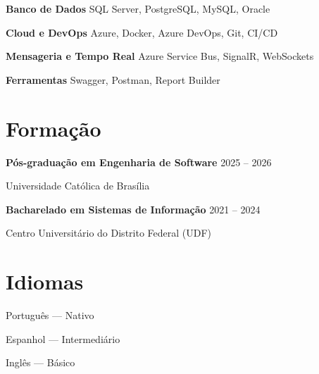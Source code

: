 \documentclass[11pt,a4paper]{article}
\begin{document}
\textbf{Banco de Dados}
SQL Server, PostgreSQL, MySQL, Oracle

\vspace{0.15cm}

\textbf{Cloud e DevOps}
Azure, Docker, Azure DevOps, Git, CI/CD

\vspace{0.15cm}

\textbf{Mensageria e Tempo Real}
Azure Service Bus, SignalR, WebSockets
\vspace{0.15cm}

\textbf{Ferramentas}
Swagger, Postman, Report Builder

\section{Formação}

\textbf{Pós-graduação em Engenharia de Software}
\hfill 2025 -- 2026

Universidade Católica de Brasília

\vspace{0.2cm}

\textbf{Bacharelado em Sistemas de Informação}
\hfill 2021 -- 2024

Centro Universitário do Distrito Federal (UDF)

\section{Idiomas}

Português — Nativo

Espanhol — Intermediário

Inglês — Básico
\end{document}
